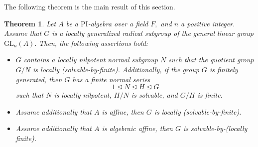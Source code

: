 \documentclass{amsart}
\newtheorem{theorem}{Theorem}[section]
\theoremstyle{definition}
\begin{document}
The following theorem is the main result of this section.
\begin{theorem}\label{th:7.2} Let $A$ be a $\mathrm{PI}$-algebra over a field $F,$ and $n$ a positive integer. Assume that $G$ is a locally generalized radical subgroup of the general linear group $\mathrm{GL}_n(A).$ Then, the following assertions hold:
	\begin{itemize}
		\item [(1)] $G$ contains a locally nilpotent normal subgroup $N$ such that the quotient group $G/N$ is locally (solvable-by-finite). Additionally, if the group $G$ is finitely generated, then $G$ has a finite normal series 
			$$1\trianglelefteq N\trianglelefteq H\trianglelefteq G$$
		 such that $N$ is locally nilpotent, $H/N$ is solvable, and $G/H$ is finite.
		\item [(2)] Assume additionally that $A$  is affine, then $G$ is locally (solvable-by-finite).
		\item [(3)] Assume additionally that $A$ is algebraic affine, then $G$ is solvable-by-(locally finite).
	\end{itemize}	
\end{theorem}
\end{document}
